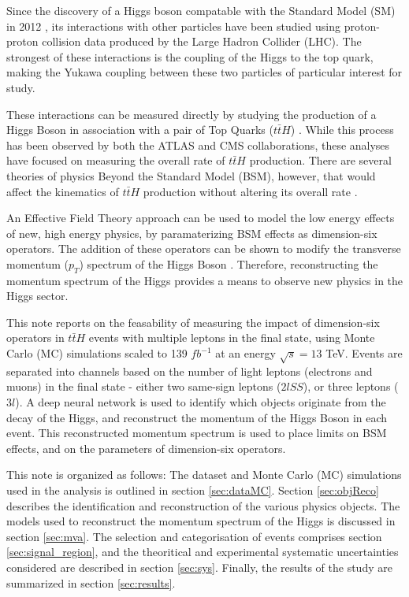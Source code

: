 Since the discovery of a Higgs boson compatable with the Standard Model (SM) in 2012 \cite{}, its interactions with other particles have been studied using proton-proton collision data produced by the Large Hadron Collider (LHC). The strongest of these interactions is the coupling of the Higgs to the top quark, making the Yukawa coupling between these two particles of particular interest for study.

These interactions can be measured directly by studying the production of a Higgs Boson in association with a pair of Top Quarks ($t\bar{t}H$) \cite{}. While this process has been observed by both the ATLAS \cite{} and CMS \cite{} collaborations, these analyses have focused on measuring the overall rate of $t\bar{t}H$ production. There are several theories of physics Beyond the Standard Model (BSM), however, that would affect the kinematics of $t\bar{t}H$ production without altering its overall rate \cite{}.  

An Effective Field Theory approach can be used to model the low energy effects of new, high energy physics, by paramaterizing BSM effects as dimension-six operators. The addition of these operators can be shown to modify the transverse momentum ($p_T$) spectrum of the Higgs Boson \cite{}. Therefore, reconstructing the momentum spectrum of the Higgs provides a means to observe new physics in the Higgs sector.  

This note reports on the feasability of measuring the impact of dimension-six operators in $t\bar{t}H$ events with multiple leptons in the final state, using Monte Carlo (MC) simulations scaled to 139 $fb^{-1}$ at an energy $\sqrt{s} = 13$ TeV. Events are separated into channels based on the number of light leptons (electrons and muons) in the final state - either two same-sign leptons ($2lSS$), or three leptons ($3l$). A deep neural network is used to identify which objects originate from the decay of the Higgs, and reconstruct the momentum of the Higgs Boson in each event. This reconstructed momentum spectrum is used to place limits on BSM effects, and on the parameters of dimension-six operators.

This note is organized as follows: The dataset and Monte Carlo (MC) simulations used in the analysis is outlined in section \ref{sec:dataMC}. Section \ref{sec:objReco} describes the identification and reconstruction of the various physics objects. The models used to reconstruct the momentum spectrum of the Higgs is discussed in section \ref{sec:mva}. The selection and categorisation of events comprises section \ref{sec:signal_region}, and the theoritical and experimental systematic uncertainties considered are described in section \ref{sec:sys}. Finally, the results of the study are summarized in section \ref{sec:results}.
